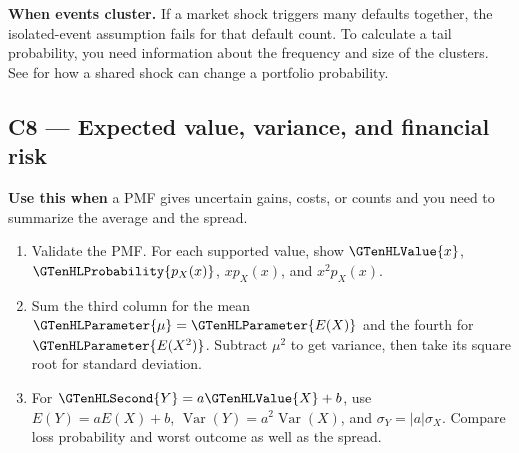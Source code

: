\textbf{When events cluster.} If a market shock triggers many defaults together, the isolated-event assumption fails for that default count. To calculate a tail probability, you need information about the frequency and size of the clusters. See  for how a shared shock can change a portfolio probability.
\par\nobreak
{}

\newpage
\subsection{C8 --- Expected value, variance, and financial risk}\label{crit:C8}
\textbf{Use this when} a PMF gives uncertain gains, costs, or counts and you need to summarize the average and the spread.

\begin{enumerate}
\item Validate the PMF. For each supported value, show \(\GTenHLValue{x}\), \(\GTenHLProbability{p_X(x)}\), \(xp_X(x)\), and \(x^2p_X(x)\).
\item Sum the third column for the mean \(\GTenHLParameter{\mu}=\GTenHLParameter{E(X)}\) and the fourth for \(\GTenHLParameter{E(X^2)}\). Subtract \(\mu^2\) to get variance, then take its square root for standard deviation.
\item For \(\GTenHLSecond{Y}=a\GTenHLValue{X}+b\), use \(E(Y)=aE(X)+b\), \(\operatorname{Var}(Y)=a^2\operatorname{Var}(X)\), and \(\sigma_Y=|a|\sigma_X\). Compare loss probability and worst outcome as well as the spread.
\end{enumerate}

